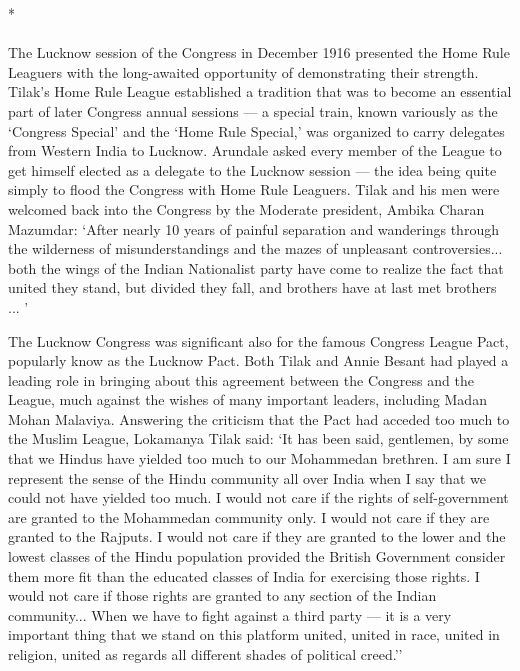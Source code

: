 \begin{center}*\end{center}

\paragraph*{}

The Lucknow session of the Congress in December 1916 presented the Home Rule Leaguers with the long-awaited opportunity of demonstrating their strength. Tilak's Home Rule League established a tradition that was to become an essential part of later Congress annual sessions --- a special train, known variously as the `Congress Special' and the `Home Rule Special,' was organized to carry delegates from Western India to Lucknow. Arundale asked every member of the League to get himself elected as a delegate to the Lucknow session --- the idea being quite simply to flood the Congress with Home Rule Leaguers. Tilak and his men were welcomed back into the Congress by the Moderate president, Ambika Charan Mazumdar: `After nearly 10 years of painful separation and wanderings through the wilderness of misunderstandings and the mazes of unpleasant controversies... both the wings of the Indian Nationalist party have come to realize the fact that united they stand, but divided they fall, and brothers have at last met brothers ... '

The Lucknow Congress was significant also for the famous Congress League Pact, popularly know as the Lucknow Pact. Both Tilak and Annie Besant had played a leading role in bringing about this agreement between the Congress and the League, much against the wishes of many important leaders, including Madan Mohan Malaviya. Answering the criticism that the Pact had acceded too much to the Muslim League, Lokamanya Tilak said: `It has been said, gentlemen, by some that we Hindus have yielded too much to our Mohammedan brethren. I am sure I represent the sense of the Hindu community all over India when I say that we could not have yielded too much. I would not care if the rights of self-government are granted to the Mohammedan community only. I would not care if they are granted to the Rajputs. I would not care if they are granted to the lower and the lowest classes of the Hindu population provided the British Government consider them more fit than the educated classes of India for exercising those rights. I would not care if those rights are granted to any section of the Indian community... When we have to fight against a third party --- it is a very important thing that we stand on this platform united, united in race, united in religion, united as regards all different shades of political creed.''

